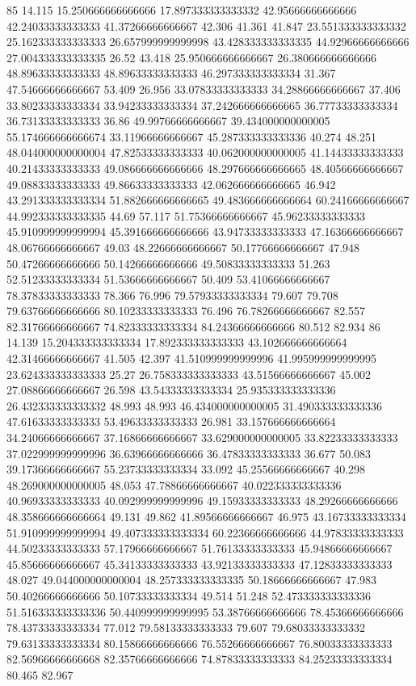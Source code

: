 85 14.115 15.250666666666666 17.897333333333332 42.95666666666666 42.24033333333333 41.37266666666667 42.306 41.361 41.847 23.551333333333332 25.162333333333333 26.657999999999998 43.428333333333335 44.92966666666666 27.004333333333335 26.52 43.418 25.950666666666667 26.380666666666666 48.89633333333333 48.89633333333333 46.297333333333334 31.367 47.54666666666667 53.409 26.956 33.07833333333333 34.28866666666667 37.406 33.80233333333334 33.94233333333334 37.242666666666665 36.77733333333334 36.73133333333333 36.86 49.99766666666667 39.434000000000005 55.174666666666674 33.11966666666667 45.287333333333336 40.274 48.251 48.044000000000004 47.82533333333333 40.062000000000005 41.14433333333333 40.21433333333333 49.086666666666666 48.297666666666665 48.40566666666667 49.08833333333333 49.86633333333333 42.062666666666665 46.942 43.291333333333334 51.882666666666665 49.483666666666664 60.24166666666667 44.992333333333335 44.69 57.117 51.75366666666667 45.96233333333333 45.910999999999994 45.391666666666666 43.94733333333333 47.16366666666667 48.06766666666667 49.03 48.22666666666667 50.17766666666667 47.948 50.47266666666666 50.14266666666666 49.50833333333333 51.263 52.51233333333334 51.53666666666667 50.409 53.41066666666667 78.37833333333333 78.366 76.996 79.57933333333334 79.607 79.708 79.63766666666666 80.10233333333333 76.496 76.78266666666667 82.557 82.31766666666667 74.82333333333334 84.24366666666666 80.512 82.934
86 14.139 15.204333333333334 17.892333333333333 43.102666666666664 42.31466666666667 41.505 42.397 41.510999999999996 41.995999999999995 23.624333333333333 25.27 26.758333333333333 43.51566666666667 45.002 27.08866666666667 26.598 43.54333333333334 25.935333333333336 26.432333333333332 48.993 48.993 46.434000000000005 31.490333333333336 47.61633333333333 53.49633333333333 26.981 33.157666666666664 34.24066666666667 37.16866666666667 33.629000000000005 33.82233333333333 37.022999999999996 36.63966666666666 36.47833333333333 36.677 50.083 39.17366666666667 55.23733333333334 33.092 45.25566666666667 40.298 48.269000000000005 48.053 47.78866666666667 40.022333333333336 40.96933333333333 40.092999999999996 49.15933333333333 48.29266666666666 48.358666666666664 49.131 49.862 41.89566666666667 46.975 43.16733333333334 51.910999999999994 49.407333333333334 60.22366666666666 44.97833333333333 44.50233333333333 57.17966666666667 51.76133333333333 45.94866666666667 45.85666666666667 45.34133333333333 43.92133333333333 47.12833333333333 48.027 49.044000000000004 48.257333333333335 50.18666666666667 47.983 50.40266666666666 50.10733333333334 49.514 51.248 52.473333333333336 51.516333333333336 50.440999999999995 53.38766666666666 78.45366666666666 78.43733333333334 77.012 79.58133333333333 79.607 79.68033333333332 79.63133333333334 80.15866666666666 76.55266666666667 76.80033333333333 82.56966666666668 82.35766666666666 74.87833333333333 84.25233333333334 80.465 82.967
